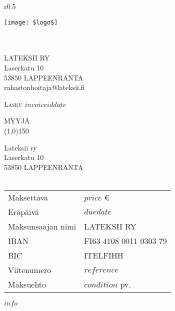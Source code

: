\documentclass[10pt,titlepage,a4paper]{article}
\begin{document}
	\selectfont
	\renewcommand{\arraystretch}{1.2}
	\pagestyle{empty} 
	\begin{wrapfigure}[1]{r}{0.5\textwidth}
		\begin{center}
			\texttt{[image: \$logo\$]}
		\end{center}
	\end{wrapfigure}
	\noindent 
	\\
	\\
	LATEKSII RY\\
	Laserkatu 10\\
	53850 LAPPEENRANTA\\
	rahastonhoitaja@lateksii.fi
	\vspace{4cm}
	\begin{tcolorbox}
		\textsc{\large Lasku $invoiceid$}\hfill{\large $date$}
	\end{tcolorbox}
	\vspace{5pt}
	\noindent
	\hspace{2pt}
	\begin{minipage}{.3\textwidth}
		\color{fuksia}
		\vspace{-7pt}
		MYYJÄ\\
		\color{black}
		\line(1,0){150}
		
		
		\vspace{2pt}
		Lateksii ry\\
		Laserkatu 10\\
		53850 LAPPEENRANTA
		\\
		\\
	\end{minipage}
	\begin{minipage}{.7\textwidth}
		\begin{flushright}
			\begin{tabular}{l l}
				Maksettava & $price$ \euro  \\
				Eräpäivä & $duedate$ \\
				Maksunsaajan nimi & LATEKSII RY\\
				IBAN & FI63 4108 0011 0303 79\\
				BIC & ITELFIHH\\
				Viitenumero & $reference$\\
				Maksuehto & $condition$ pv.
			\end{tabular}
		\end{flushright}
	\end{minipage}
	
	\vspace{2cm}
	\color{darkgray}
	$info$
	\vspace{\fill}
	
\end{document}

